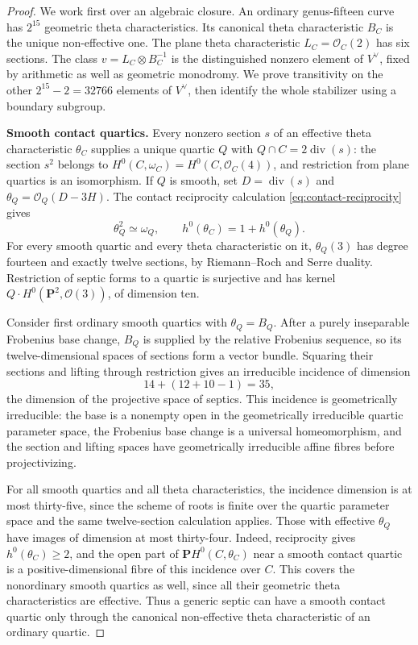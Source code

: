 \begin{proof}
We work first over an algebraic closure.  An ordinary genus-fifteen
curve has $2^{15}$ geometric theta characteristics.  Its canonical
theta characteristic $B_C$ is the unique non-effective one.  The
plane theta characteristic $L_C=\mathcal O_C(2)$ has six sections.
The class $v=L_C\otimes B_C^{-1}$ is the distinguished nonzero element
of $V^\vee$, fixed by arithmetic as well as geometric monodromy.
We prove transitivity on the other $2^{15}-2=32766$ elements of
$V^\vee$, then identify the whole stabilizer using a boundary subgroup.

\par\smallskip\noindent\textbf{Smooth contact quartics.}
Every nonzero section $s$ of an effective theta characteristic
$\theta_C$ supplies a unique quartic $Q$ with
$Q\cap C=2\operatorname{div}(s)$: the section $s^2$ belongs to
$H^0(C,\omega_C)=H^0(C,\mathcal O_C(4))$, and restriction from plane
quartics is an isomorphism.  If $Q$ is smooth, set
$D=\operatorname{div}(s)$ and
$\theta_Q=\mathcal O_Q(D-3H)$.  The contact reciprocity calculation
\eqref{eq:contact-reciprocity} gives
\[
 \theta_Q^2\simeq\omega_Q,\qquad
 h^0(\theta_C)=1+h^0(\theta_Q).
\]
For every smooth quartic and every theta characteristic on it,
$\theta_Q(3)$ has degree fourteen and exactly twelve sections, by
Riemann--Roch and Serre duality.  Restriction of septic forms to a
quartic is surjective and has kernel
$Q\cdot H^0(\mathbf P^2,\mathcal O(3))$, of dimension ten.

Consider first ordinary smooth quartics with $\theta_Q=B_Q$.
After a purely inseparable Frobenius base change, $B_Q$ is supplied
by the relative Frobenius sequence, so its twelve-dimensional spaces
of sections form a vector bundle.  Squaring their sections and lifting
through restriction gives an irreducible incidence of dimension
\[
 14+(12+10-1)=35,
\]
the dimension of the projective space of septics.  This incidence is
geometrically irreducible: the base is a nonempty open in the
geometrically irreducible quartic parameter space, the Frobenius
base change is a universal homeomorphism, and the section and lifting
spaces have geometrically irreducible affine fibres before
projectivizing.

For all smooth quartics and all theta characteristics, the incidence
dimension is at most thirty-five, since the scheme of roots is
finite over the quartic parameter space and the same twelve-section
calculation applies.  Those with effective $\theta_Q$ have images
of dimension at most thirty-four.  Indeed, reciprocity gives
$h^0(\theta_C)\ge2$, and the open part of
$\mathbf P H^0(C,\theta_C)$ near a smooth contact quartic is a
positive-dimensional fibre of this incidence over $C$.  This covers
the nonordinary smooth quartics as well, since all their geometric
theta characteristics are effective.  Thus a generic septic can
have a smooth contact quartic only through the canonical
non-effective theta characteristic of an ordinary quartic.


\end{proof}
